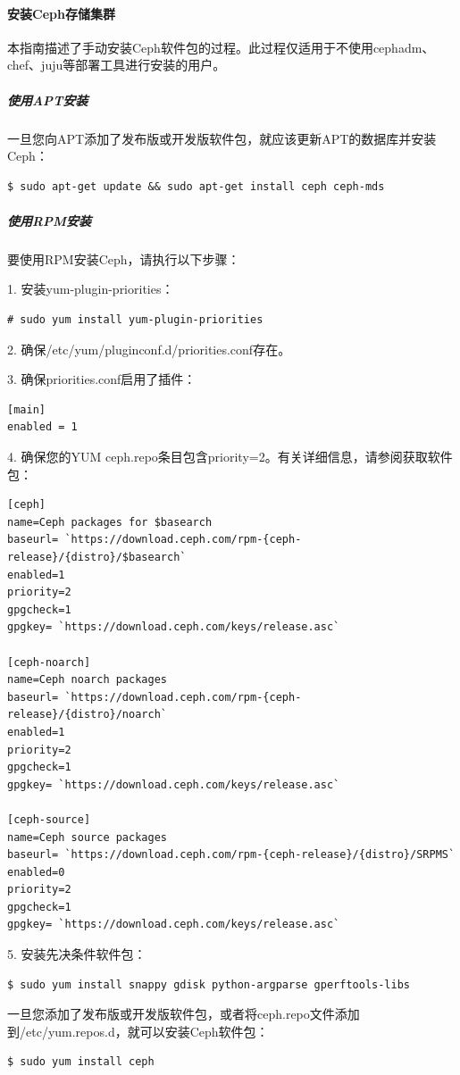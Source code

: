 \documentclass[12pt,UTF8]{ctexbook}
\begin{document}
\paragraph{安装Ceph存储集群}
本指南描述了手动安装Ceph软件包的过程。此过程仅适用于不使用cephadm、chef、juju等部署工具进行安装的用户。

\subparagraph{使用APT安装}
一旦您向APT添加了发布版或开发版软件包，就应该更新APT的数据库并安装Ceph：
\begin{verbatim}
$ sudo apt-get update && sudo apt-get install ceph ceph-mds
\end{verbatim}

\subparagraph{使用RPM安装}
要使用RPM安装Ceph，请执行以下步骤：

1. 安装yum-plugin-priorities：
\begin{verbatim}
# sudo yum install yum-plugin-priorities
\end{verbatim}

2. 确保/etc/yum/pluginconf.d/priorities.conf存在。

3. 确保priorities.conf启用了插件：
\begin{verbatim}
[main]
enabled = 1
\end{verbatim}

4. 确保您的YUM ceph.repo条目包含priority=2。有关详细信息，请参阅获取软件包：
\begin{verbatim}
[ceph]
name=Ceph packages for $basearch
baseurl= `https://download.ceph.com/rpm-{ceph-release}/{distro}/$basearch` 
enabled=1
priority=2
gpgcheck=1
gpgkey= `https://download.ceph.com/keys/release.asc` 

[ceph-noarch]
name=Ceph noarch packages
baseurl= `https://download.ceph.com/rpm-{ceph-release}/{distro}/noarch` 
enabled=1
priority=2
gpgcheck=1
gpgkey= `https://download.ceph.com/keys/release.asc` 

[ceph-source]
name=Ceph source packages
baseurl= `https://download.ceph.com/rpm-{ceph-release}/{distro}/SRPMS` 
enabled=0
priority=2
gpgcheck=1
gpgkey= `https://download.ceph.com/keys/release.asc` 
\end{verbatim}

5. 安装先决条件软件包：
\begin{verbatim}
$ sudo yum install snappy gdisk python-argparse gperftools-libs
\end{verbatim}

一旦您添加了发布版或开发版软件包，或者将ceph.repo文件添加到/etc/yum.repos.d，就可以安装Ceph软件包：
\begin{verbatim}
$ sudo yum install ceph
\end{verbatim}
\end{document}
